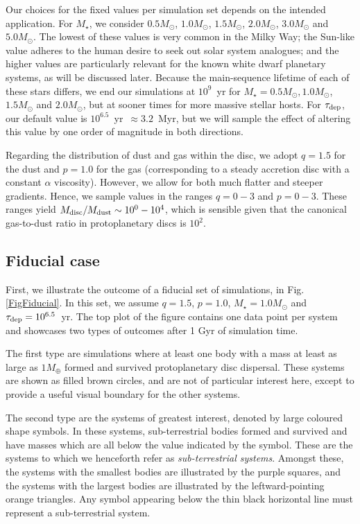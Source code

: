\documentclass[useAMS,usenatbib]{mn2e}
\newcommand{\rev}{ }
\begin{document}
Our choices for the fixed values per simulation set depends on the intended application. For $M_{\star}$, we consider $0.5M_{\odot}$, $1.0M_{\odot}$, $1.5M_{\odot}$, $2.0M_{\odot}$, $3.0M_{\odot}$ and $5.0M_{\odot}$. The lowest of these values is very common in the Milky Way; the Sun-like value adheres to the human desire to seek out solar system analogues; and the higher values are particularly relevant for the known white dwarf planetary systems, as will be discussed later. Because the main-sequence lifetime of each of these stars differs, we end our simulations at $10^9$~yr for $M_{\star} = 0.5M_{\odot}, 1.0M_{\odot}$, $1.5M_{\odot}$ and $2.0M_{\odot}$, but at sooner times for more massive stellar hosts. For $\tau_{\rm dep}$, our default value is $10^{6.5}$~yr~$\approx 3.2$~Myr, but we will sample the effect of altering this value by one order of magnitude in both directions.

Regarding the distribution of dust and gas within the disc, {\rev we adopt $q=1.5$ for the dust and $p=1.0$ for the gas (corresponding to} a steady accretion disc with a constant $\alpha$ viscosity). However, we allow for both much flatter and steeper gradients. Hence, we sample values in the ranges $q=0-3$ and $p=0-3$. These ranges yield $M_{\rm disc}/M_{\rm dust} \sim 10^0 - 10^4$, which is sensible given that the canonical gas-to-dust ratio in protoplanetary discs is $10^2$.

\subsection{Fiducial case}

First, we illustrate the outcome of a fiducial set of simulations, in Fig. \ref{FigFiducial}. In this set, we assume $q=1.5$, $p=1.0$, $M_{\star} = 1.0M_{\odot}$ and $\tau_{\rm dep} = 10^{6.5}$~yr. The top plot of the figure contains one data point per system and showcases two types of outcomes after 1 Gyr of simulation time. 

The first type are simulations where at least one body with a mass at least as large as $1M_{\oplus}$ formed and survived protoplanetary disc dispersal. These systems are shown as filled brown circles, and are not of particular interest here, except to provide a useful visual boundary for the other systems.

The second type are the systems of greatest interest, denoted by large coloured shape symbols. In these systems, sub-terrestrial bodies formed and survived and have masses which are all below the value indicated by the symbol. These are the systems to which we henceforth refer as {\it sub-terrestrial systems}. Amongst these, the systems with the smallest bodies are illustrated by the purple squares, and the systems with the largest bodies are illustrated by the leftward-pointing orange triangles. Any symbol appearing below the thin black horizontal line must represent a sub-terrestrial system.
\end{document}
